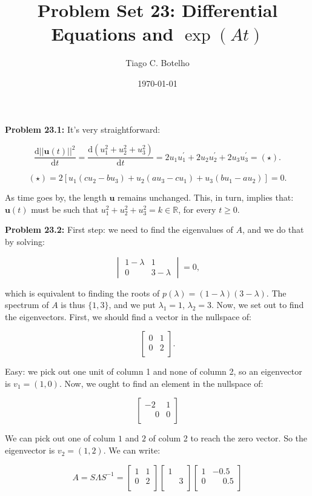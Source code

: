 \documentclass{article}
\title{Problem Set 23: Differential Equations and $\exp(At)$}
\author{Tiago C. Botelho}
\date{\today}
\begin{document}
\maketitle

\noindent \textbf{Problem 23.1:} It's very straightforward:

\[
\frac{\text{d}||\mathbf{u}(t)||^{2}}{\text{d}t} = \frac{\text{d}(u_1^{2} + u_2^{2} + u_3^{2})}{\text{d}t} = 2u_1u_1^{\prime} + 2u_2u_2^{\prime} + 2u_3u_3^{\prime} = (\star).
\]

\[
(\star) = 2[u_1(cu_2 - bu_3) + u_2(au_3 - cu_1) + u_3(bu_1 - au_2)] = 0.
\]

As time goes by, the length $\mathbf{u}$ remains unchanged. This, in turn, implies that: $\mathbf{u}(t)$ must be such that $u_1^{2} + u_2^{2} + u_3^{2} = k \in \mathbb{R}$, for every $t \geq 0$.

\noindent \textbf{Problem 23.2:} First step: we need to find the eigenvalues of $A$, and we do that by solving:

\[
\begin{vmatrix}
1 - \lambda & 1\\
0 & 3 - \lambda
\end{vmatrix}
= 0,
\]

which is equivalent to finding the roots of $p(\lambda) = (1-\lambda)(3-\lambda)$. The spectrum of $A$ is thus $\{1, 3\}$, and we put $\lambda_1 = 1$, $\lambda_2 = 3$. Now, we set out to find the eigenvectors. First, we should find a vector in the nullspace of:

\[
\begin{bmatrix}
0 & 1\\
0 & 2\\
\end{bmatrix}.
\]

Easy: we pick out one unit of column 1 and none of column 2, so an eigenvector is $v_1 = (1, 0)$. Now, we ought to find an element in the nullspace of:

\[
\begin{bmatrix}
-2 & 1\\
\phantom{-}0 & 0\\
\end{bmatrix}
\]

We can pick out one of colum $1$ and $2$ of colum 2 to reach the zero vector. So the eigenvector is $v_2 = (1, 2)$. We can write:

\[
A = S\Lambda S^{-1} = \begin{bmatrix}
1 & 1\\
0 & 2\\
\end{bmatrix}
\begin{bmatrix}
1 & \\
  & 3\\
\end{bmatrix}
\begin{bmatrix}
1 & -0.5\\
0 & \phantom{-}0.5\\
\end{bmatrix}
\]
\end{document}
